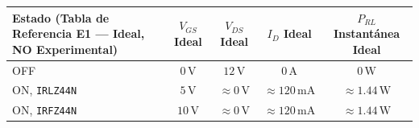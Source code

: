 \documentclass[10pt, a4paper, landscape]{article}
\begin{document}
\par\vspace{0.08cm}\noindent
\renewcommand{\arraystretch}{1.2}
\begin{tabularx}{\linewidth}{|>{\raggedright\arraybackslash}X|c|c|c|c|}
\hline
\rowcolor{ucbgray}
\textbf{Estado (Tabla de Referencia E1 — Ideal, NO Experimental)} & \textbf{$V_{GS}$ Ideal} & \textbf{$V_{DS}$ Ideal} & \textbf{$I_D$ Ideal} & \textbf{$P_{RL}$ Instantánea Ideal} \\ \hline
OFF & $0\,\text{V}$ & $12\,\text{V}$ & $0\,\text{A}$ & $0\,\text{W}$ \\ \hline
ON, \texttt{IRLZ44N} & $5\,\text{V}$ & $\approx 0\,\text{V}$ & $\approx 120\,\text{mA}$ & $\approx 1.44\,\text{W}$ \\ \hline
ON, \texttt{IRFZ44N} & $10\,\text{V}$ & $\approx 0\,\text{V}$ & $\approx 120\,\text{mA}$ & $\approx 1.44\,\text{W}$ \\ \hline
\end{tabularx}
\end{document}
